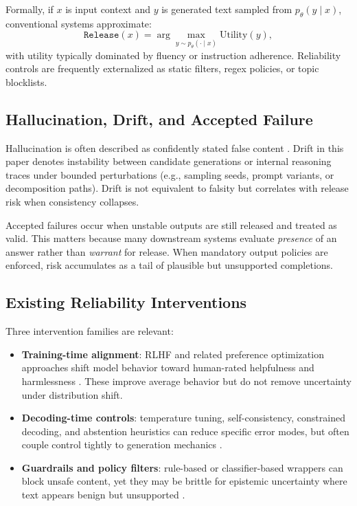 \documentclass[11pt]{article}
\begin{document}
Formally, if $x$ is input context and $y$ is generated text sampled from $p_\theta(y\mid x)$, conventional systems approximate:
\begin{equation}
\texttt{Release}(x) = \arg\max_{y \sim p_\theta(\cdot\mid x)} \text{Utility}(y),
\end{equation}
with utility typically dominated by fluency or instruction adherence. Reliability controls are frequently externalized as static filters, regex policies, or topic blocklists.

\subsection{Hallucination, Drift, and Accepted Failure}
Hallucination is often described as confidently stated false content \cite{ji2023survey,maynez2020faithfulness}. Drift in this paper denotes instability between candidate generations or internal reasoning traces under bounded perturbations (e.g., sampling seeds, prompt variants, or decomposition paths). Drift is not equivalent to falsity but correlates with release risk when consistency collapses.

Accepted failures occur when unstable outputs are still released and treated as valid. This matters because many downstream systems evaluate \emph{presence} of an answer rather than \emph{warrant} for release. When mandatory output policies are enforced, risk accumulates as a tail of plausible but unsupported completions.

\subsection{Existing Reliability Interventions}
Three intervention families are relevant:
\begin{itemize}[leftmargin=1.5em]
    \item \textbf{Training-time alignment}: RLHF and related preference optimization approaches shift model behavior toward human-rated helpfulness and harmlessness \cite{ouyang2022training,bai2022constitutional,rafailov2023dpo}. These improve average behavior but do not remove uncertainty under distribution shift.
    \item \textbf{Decoding-time controls}: temperature tuning, self-consistency, constrained decoding, and abstention heuristics can reduce specific error modes, but often couple control tightly to generation mechanics \cite{wang2023selfconsistency,holtzman2020curious}.
    \item \textbf{Guardrails and policy filters}: rule-based or classifier-based wrappers can block unsafe content, yet they may be brittle for epistemic uncertainty where text appears benign but unsupported \cite{manakul2023selfcheckgpt,min2023factscore}.
\end{itemize}
\end{document}

